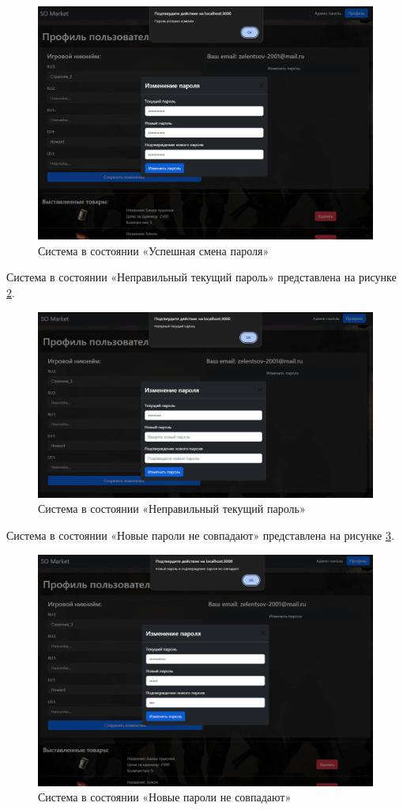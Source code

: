 \begin{figure}[ht]
	\centering
	\includegraphics[width=0.7\linewidth]{images/passw_web3}
	\caption{Система в состоянии «Успешная смена пароля»}
	\label{fig:passwweb3}
\end{figure}

Система в состоянии «Неправильный текущий пароль» представлена на рисунке \ref{fig:passwweb1}.

\begin{figure}[ht]
	\centering
	\includegraphics[width=0.7\linewidth]{images/passw_web1}
	\caption{Система в состоянии «Неправильный текущий пароль»}
	\label{fig:passwweb1}
\end{figure}

Система в состоянии «Новые пароли не совпадают» представлена на рисунке \ref{fig:passwweb2}.

\begin{figure}[ht]
	\centering
	\includegraphics[width=0.7\linewidth]{images/passw_web2}
	\caption{Система в состоянии «Новые пароли не совпадают»}
	\label{fig:passwweb2}
\end{figure}

